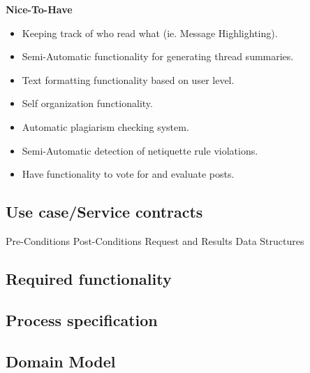 \documentclass[a4paper,12pt]{report}
\begin{document}
\textbf{Nice-To-Have} 
\begin{itemize}
  \item Keeping track of who read what (ie. Message Highlighting).
  \item Semi-Automatic functionality for generating thread summaries.
  \item Text formatting functionality based on user level.
  \item Self organization functionality.
  \item Automatic plagiarism checking system.
  \item Semi-Automatic detection of netiquette rule violations.
  \item Have functionality to vote for and evaluate posts.
\end{itemize}
\subsection{Use case/Service contracts}
Pre-Conditions
Post-Conditions
Request and Results Data Structures
\subsection{Required functionality}
\subsection{Process specification}
\subsection{Domain Model}

\newpage


{} %

\end{document}
